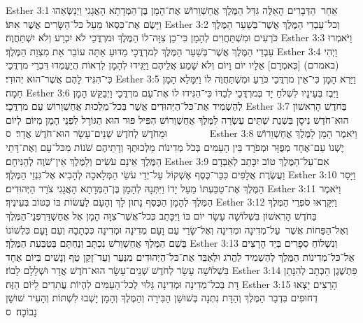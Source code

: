 Esther 3:1	אַחַר  הַדְּבָרִים הָאֵלֶּה גִּדַּל הַמֶּלֶךְ אֲחַשְׁוֵרוֹשׁ אֶת־הָמָן בֶּן־הַמְּדָתָא הָאֲגָגִי וַיְנַשְּׂאֵהוּ וַיָּשֶׂם אֶת־כִּסְאוֹ מֵעַל כּל־הַשָּׂרִים אֲשֶׁר אִתּוֹ׃
Esther 3:2	וְכל־עַבְדֵי הַמֶּלֶךְ אֲשֶׁר־בְּשַׁעַר הַמֶּלֶךְ כֹּרְעִים וּמִשְׁתַּחֲוִים לְהָמָן כִּי־כֵן צִוָּה־לוֹ הַמֶּלֶךְ וּמרְדֳּכַי לֹא יִכְרַע וְלֹא יִשְׁתַּחֲוֶה׃
Esther 3:3	וַיֹּאמְרוּ עַבְדֵי הַמֶּלֶךְ אֲשֶׁר־בְּשַׁעַר הַמֶּלֶךְ לְמרְדֳּכָי מַדּוּעַ אַתָּה עוֹבֵר אֵת מִצְוַת הַמֶּלֶךְ׃
Esther 3:4	וַיְהִי (באמרם) [כְּאמְרָם] אֵלָיו יוֹם וָיוֹם וְלֹא שָׁמַע אֲלֵיהֶם וַיַּגִּידוּ לְהָמָן לִרְאוֹת הֲיַעַמְדוּ דִּבְרֵי מרְדֳּכַי כִּי־הִגִּיד לָהֶם אֲשֶׁר־הוּא יְהוּדִי׃
Esther 3:5	וַיַּרְא הָמָן כִּי־אֵין מרְדֳּכַי כֹּרֵעַ וּמִשְׁתַּחֲוֶה לוֹ וַיִּמָּלֵא הָמָן חֵמָה׃
Esther 3:6	וַיִּבֶז בְּעֵינָיו לִשְׁלֹחַ יָד בְּמרְדֳּכַי לְבַדּוֹ כִּי־הִגִּידוּ לוֹ אֶת־עַם מרְדֳּכָי וַיְבַקֵּשׁ הָמָן לְהַשְׁמִיד אֶת־כּל־הַיְּהוּדִים אֲשֶׁר בְּכל־מַלְכוּת אֲחַשְׁוֵרוֹשׁ עַם מרְדֳּכָי׃
Esther 3:7	בַּחֹדֶשׁ הָרִאשׁוֹן הוּא־חֹדֶשׁ נִיסָן בִּשְׁנַת שְׁתֵּים עֶשְׂרֵה לַמֶּלֶךְ אֲחַשְׁוֵרוֹשׁ הִפִּיל פּוּר הוּא הַגּוֹרָל לִפְנֵי הָמָן מִיּוֹם  לְיוֹם וּמֵחֹדֶשׁ לְחֹדֶשׁ שְׁנֵים־עָשָׂר הוּא־חֹדֶשׁ אֲדָר׃ {ס}        
Esther 3:8	וַיֹּאמֶר הָמָן לַמֶּלֶךְ אֲחַשְׁוֵרוֹשׁ יֶשְׁנוֹ עַם־אֶחָד מְפֻזָּר וּמְפֹרָד בֵּין הָעַמִּים בְּכֹל מְדִינוֹת מַלְכוּתֶךָ וְדָתֵיהֶם שֹׁנוֹת מִכּל־עָם וְאֶת־דָּתֵי הַמֶּלֶךְ אֵינָם עֹשִׂים וְלַמֶּלֶךְ אֵין־שֹׁוֶה לְהַנִּיחָם׃
Esther 3:9	אִם־עַל־הַמֶּלֶךְ טוֹב יִכָּתֵב לְאַבְּדָם וַעֲשֶׂרֶת אֲלָפִים כִּכַּר־כֶּסֶף אֶשְׁקוֹל עַל־יְדֵי עֹשֵׂי הַמְּלָאכָה לְהָבִיא אֶל־גִּנְזֵי הַמֶּלֶךְ׃
Esther 3:10	וַיָּסַר הַמֶּלֶךְ אֶת־טַבַּעְתּוֹ מֵעַל יָדוֹ וַיִּתְּנָהּ לְהָמָן בֶּן־הַמְּדָתָא הָאֲגָגִי צֹרֵר הַיְּהוּדִים׃
Esther 3:11	וַיֹּאמֶר הַמֶּלֶךְ לְהָמָן הַכֶּסֶף נָתוּן לָךְ וְהָעָם לַעֲשׂוֹת בּוֹ כַּטּוֹב בְּעֵינֶיךָ׃
Esther 3:12	וַיִּקָּרְאוּ סֹפְרֵי הַמֶּלֶךְ בַּחֹדֶשׁ הָרִאשׁוֹן בִּשְׁלוֹשָׁה עָשָׂר יוֹם בּוֹ וַיִּכָּתֵב כְּכל־אֲשֶׁר־צִוָּה הָמָן אֶל אֲחַשְׁדַּרְפְּנֵי־הַמֶּלֶךְ וְאֶל־הַפַּחוֹת אֲשֶׁר  עַל־מְדִינָה וּמְדִינָה וְאֶל־שָׂרֵי עַם וָעָם מְדִינָה וּמְדִינָה כִּכְתָבָהּ וְעַם וָעָם כִּלְשׁוֹנוֹ בְּשֵׁם הַמֶּלֶךְ אֲחַשְׁוֵרֹשׁ נִכְתָּב וְנֶחְתָּם בְּטַבַּעַת הַמֶּלֶךְ׃
Esther 3:13	וְנִשְׁלוֹחַ סְפָרִים בְּיַד הָרָצִים אֶל־כּל־מְדִינוֹת הַמֶּלֶךְ לְהַשְׁמִיד לַהֲרֹג וּלְאַבֵּד אֶת־כּל־הַיְּהוּדִים מִנַּעַר וְעַד־זָקֵן טַף וְנָשִׁים בְּיוֹם אֶחָד בִּשְׁלוֹשָׁה עָשָׂר לְחֹדֶשׁ שְׁנֵים־עָשָׂר הוּא־חֹדֶשׁ אֲדָר וּשְׁלָלָם לָבוֹז׃
Esther 3:14	פַּתְשֶׁגֶן הַכְּתָב לְהִנָּתֵן דָּת בְּכל־מְדִינָה וּמְדִינָה גָּלוּי לְכל־הָעַמִּים לִהְיוֹת עֲתִדִים לַיּוֹם הַזֶּה׃
Esther 3:15	הָרָצִים יָצְאוּ דְחוּפִים בִּדְבַר הַמֶּלֶךְ וְהַדָּת נִתְּנָה בְּשׁוּשַׁן הַבִּירָה וְהַמֶּלֶךְ וְהָמָן יָשְׁבוּ לִשְׁתּוֹת וְהָעִיר שׁוּשָׁן נָבוֹכָה׃ {ס}        
